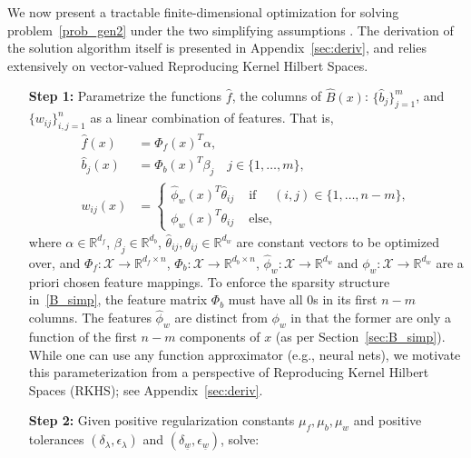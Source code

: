 \documentclass[conference]{svproc}
\newcommand{\revision}[1]{{\color{black}{#1}}}
\newcommand{\X}{\mathcal{X}}
\newcommand{\reals}{\mathbb{R}}
\newcommand{\wl}{\underline{w}}
\begin{document}
We now present a tractable finite-dimensional optimization for solving problem~\eqref{prob_gen2} under the two simplifying assumptions \revision{introduced in the previous sections}. The derivation of the solution algorithm itself is presented in Appendix~\ref{sec:deriv}, and relies extensively on vector-valued Reproducing Kernel Hilbert Spaces. 

\begin{leftbox}
\begin{itemize}[leftmargin=0.4in]
    \item[{\bf Step 1:}] Parametrize the functions $\hat{f}$, the columns of $\hat{B}(x)$: $\{\hat{b}_j\}_{j=1}^{m}$, and $\{w_{ij}\}_{i,j=1}^{n}$ as a linear combination of features. That is, 
\begin{align}
    \hat{f}(x) &= \Phi_f(x)^T \alpha, \label{param_1}\\
    \hat{b}_j(x) &= \Phi_b(x)^T \beta_j  \quad j \in \{1,\ldots, m\}, \\
    w_{ij}(x) &= \begin{cases} \hat{\phi}_w(x)^T \hat{\theta}_{ij} &\text{ if }\quad  (i,j) \in \{1,\ldots,n-m\}, \\
    \phi_w(x)^T \theta_{ij} &\text{ else}, \label{param_2}
    \end{cases}
\end{align}
where $\alpha \in \reals^{d_f}$, $\beta_j \in \reals^{d_b}$, $\hat{\theta}_{ij}, \theta_{ij} \in \reals^{d_w}$ are constant vectors to be optimized over, and $\Phi_f : \X \rightarrow \reals^{d_f\times n}$, $\Phi_b : \X \rightarrow \reals^{d_b \times n}$, $\hat{\phi}_w : \X \rightarrow \reals^{d_w}$ and $\phi_w : \X \rightarrow \reals^{d_w}$ are a priori chosen feature mappings. To enforce the sparsity structure in~\eqref{B_simp}, the feature matrix $\Phi_b$ must have all 0s in its first $n-m$ columns. The features $\hat{\phi}_w$ are distinct from $\phi_w$ in that the former are only a function of the first $n-m$ components of $x$ (as per Section~\ref{sec:B_simp}).
While one can use any function approximator (e.g., neural nets), we motivate this parameterization from a perspective of Reproducing Kernel Hilbert Spaces (RKHS); see Appendix~\ref{sec:deriv}.
\newline
\item[{\bf Step 2:}] Given positive regularization constants $\mu_f, \mu_b, \mu_w$ and positive tolerances $(\delta_\lambda,\epsilon_\lambda)$ and $(\delta_{\wl}, \epsilon_{\wl})$, solve:
\begin{subequations}\label{learn_finite}

\end{subequations}
\end{itemize}
\end{leftbox}
\end{document}
